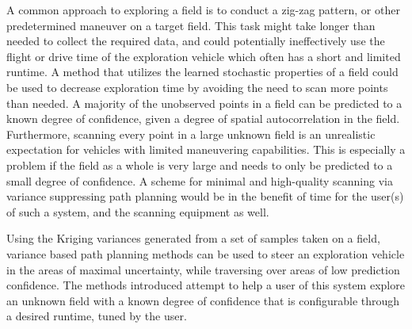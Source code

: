 A common approach to exploring a field is to conduct a zig-zag pattern, or other predetermined maneuver on a target field. This task might take longer than needed to collect the required data, and could potentially ineffectively use the flight or drive time of the exploration vehicle which often has a short and limited runtime. A method that utilizes the learned stochastic properties of a field could be used to decrease exploration time by avoiding the need to scan more points than needed. A majority of the unobserved points in a field can be predicted to a known degree of confidence, given a degree of spatial autocorrelation in the field. Furthermore, scanning every point in a large unknown field is an unrealistic expectation for vehicles with limited maneuvering capabilities. This is especially a problem if the field as a whole is very large and needs to only be predicted to a small degree of confidence. A scheme for minimal and high-quality scanning via variance suppressing path planning would be in the benefit of time for the user(s) of such a system, and the scanning equipment as well.

Using the Kriging variances generated from a set of samples taken on a field, variance based path planning methods can be used to steer an exploration vehicle in the areas of maximal uncertainty, while traversing over  areas of low prediction confidence. The methods introduced attempt to help a user of this system explore an unknown field with a known degree of confidence that is configurable through a desired runtime, tuned by the user.



